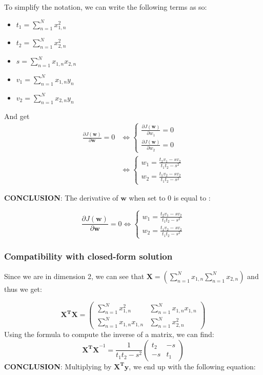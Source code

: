 \documentclass{article}
\begin{document}
\newline To simplify the notation, we can write the following terms as so:
\begin{itemize}
\item $t_1 = \sum_{n=1}^{N}x_{1,n}^2$ 
\item $t_2 = \sum_{n=1}^{N}x_{2,n}^2$
\item $s = \sum_{n=1}^{N}x_{1,n}x_{2,n}$
\item $v_1 = \sum_{n=1}^{N}x_{1,n}y_n$
\item $v_2 = \sum_{n=1}^{N}x_{2,n}y_n$
\end{itemize}
And get
\[
\begin{split}
\frac{\partial J(\mathbf{w})}{\partial \mathbf{w}} = 0 & \Longleftrightarrow \begin{cases}
\frac{\partial J(\mathbf{w})}{\partial w_1} = 0 \\
\frac{\partial J(\mathbf{w})}{\partial w_2} = 0 
\end{cases} \\
& \Longleftrightarrow
\begin{cases}
w_1 = \frac{t_2v_1-sv_2}{t_1t_2-s^2} \\
w_2 = \frac{t_1v_2-sv_2}{t_1t_2-s^2}
\end{cases}
\end{split}
\]

\textbf{CONCLUSION}: The derivative of $\mathbf{w}$ when set to 0 is equal to :

\begin{equation} \label{eq3}
\boxed{
\frac{\partial J(\mathbf{w})}{\partial \mathbf{w}} = 0 \Longleftrightarrow
\begin{cases}
w_1 = \frac{t_2v_1-sv_2}{t_1t_2-s^2} \\
w_2 = \frac{t_1v_2-sv_2}{t_1t_2-s^2}
\end{cases}
}
\end{equation}
\subsubsection{Compatibility with closed-form solution}
Since we are in dimension 2, we can see that $\mathbf{X} = (\sum\limits_{n=1}^{N}x_{1,n} \sum\limits_{n=1}^{N}x_{2,n})$ and thus we get:

\[
\mathbf{X^TX} = \begin{pmatrix}\sum\limits_{n=1}^{N}x_{1,n}^2&\sum\limits_{n=1}^{N}x_{1,n}x_{1,n}\\ 
\sum\limits_{n=1}^{N}x_{1,n}x_{1,n}&\sum\limits_{n=1}^{N}x_{2,n}^2
\end{pmatrix} 
\]
Using the formula to compute the inverse of a matrix, we can find:
\[
\mathbf{X^TX}^{-1} = \frac{1}{t_1t_2-s^2}
\begin{pmatrix}t_2&-s\\-s&t_1
\end{pmatrix} 
\]
\textbf{CONCLUSION}: Multiplying by $\mathbf{X^Ty}$, we end up with the following equation:
\end{document}

